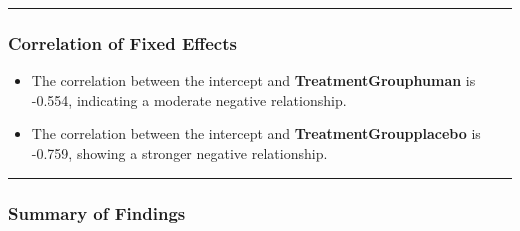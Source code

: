 \documentclass[
]{article}
\providecommand{\tightlist}{%
  \setlength{\itemsep}{0pt}\setlength{\parskip}{0pt}}
\begin{document}
\begin{center}\rule{0.5\linewidth}{0.5pt}\end{center}

\subsubsection{\texorpdfstring{\textbf{Correlation of Fixed
Effects}}{Correlation of Fixed Effects}}\label{correlation-of-fixed-effects}

\begin{itemize}
\tightlist
\item
  The correlation between the intercept and \textbf{TreatmentGrouphuman}
  is -0.554, indicating a moderate negative relationship.
\item
  The correlation between the intercept and
  \textbf{TreatmentGroupplacebo} is -0.759, showing a stronger negative
  relationship.
\end{itemize}

\begin{center}\rule{0.5\linewidth}{0.5pt}\end{center}

\subsubsection{\texorpdfstring{\textbf{Summary of
Findings}}{Summary of Findings}}\label{summary-of-findings}
\end{document}
